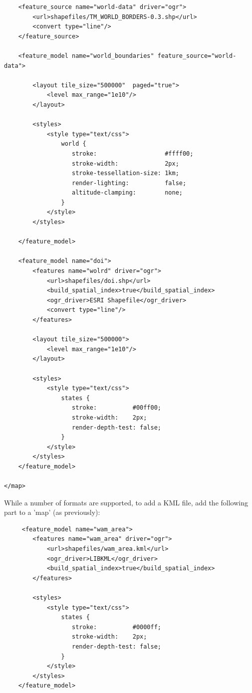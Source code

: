 {\begin{verbatim}
    <feature_source name="world-data" driver="ogr">
        <url>shapefiles/TM_WORLD_BORDERS-0.3.shp</url>
        <convert type="line"/>
    </feature_source>
    
    <feature_model name="world_boundaries" feature_source="world-data">
        
        <layout tile_size="500000"  paged="true">
            <level max_range="1e10"/>
        </layout>
                
        <styles>
            <style type="text/css">
                world {
                   stroke:                   #ffff00;
                   stroke-width:             2px;
                   stroke-tessellation-size: 1km;
                   render-lighting:          false;
                   altitude-clamping:        none;
                }            
            </style>
        </styles>
        
    </feature_model>
  
    <feature_model name="doi">
        <features name="wolrd" driver="ogr">
            <url>shapefiles/doi.shp</url>
            <build_spatial_index>true</build_spatial_index>
            <ogr_driver>ESRI Shapefile</ogr_driver>
            <convert type="line"/>
        </features>        

        <layout tile_size="500000">
            <level max_range="1e10"/>
        </layout>

        <styles>
            <style type="text/css">
                states {
                   stroke:          #00ff00; 
                   stroke-width:    2px;
                   render-depth-test: false;
                }                    
            </style>
        </styles>        
    </feature_model>
  
</map>
\end{verbatim}

While a number of formats are supported, to add a KML file, add the following part to a 'map' (as previously):

\begin{verbatim}
     <feature_model name="wam_area">
        <features name="wam_area" driver="ogr">
            <url>shapefiles/wam_area.kml</url>
            <ogr_driver>LIBKML</ogr_driver>
            <build_spatial_index>true</build_spatial_index>
        </features>        

        <styles>
            <style type="text/css">
                states {
                   stroke:          #0000ff; 
                   stroke-width:    2px;
                   render-depth-test: false;
                }                    
            </style>
        </styles>        
    </feature_model>
\end{verbatim}

}
